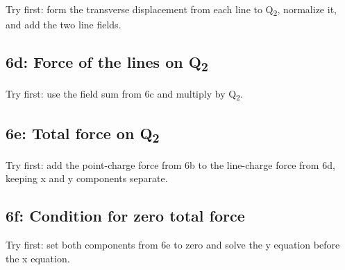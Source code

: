 \documentclass[11pt]{article}
\begin{document}
\begin{keepsection}
\begin{keepsection}
Try first: form the transverse displacement from each line to Q\textsubscript{2}, normalize it, and add the two line fields.

\end{keepsection}

\begin{keepsection}
\subsection{6d: Force of the lines on Q\textsubscript{2}}

Try first: use the field sum from 6c and multiply by Q\textsubscript{2}.

\end{keepsection}

\begin{keepsection}
\subsection{6e: Total force on Q\textsubscript{2}}

Try first: add the point-charge force from 6b to the line-charge force from 6d, keeping x and y components separate.

\end{keepsection}

\begin{keepsection}
\subsection{6f: Condition for zero total force}

Try first: set both components from 6e to zero and solve the y equation before the x equation.

\end{keepsection}
\end{keepsection}
\end{document}
